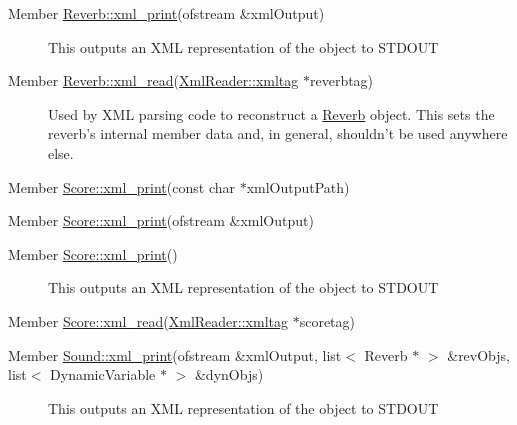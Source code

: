 \label{_deprecated000027}
\hypertarget{deprecated__deprecated000027}{}
 \begin{description}
\item[Member \hyperlink{classReverb_a12}{Reverb::xml\_\-print}(ofstream \&xml\-Output) ]This outputs an XML representation of the object to STDOUT \end{description}


\label{_deprecated000028}
\hypertarget{deprecated__deprecated000028}{}
 \begin{description}
\item[Member \hyperlink{classReverb_a19}{Reverb::xml\_\-read}(\hyperlink{classXmlReader_1_1xmltag}{Xml\-Reader::xmltag} $\ast$reverbtag) ]Used by XML parsing code to reconstruct a \hyperlink{classReverb}{Reverb} object. This sets the reverb's internal member data and, in general, shouldn't be used anywhere else. \end{description}


\label{_deprecated000031}
\hypertarget{deprecated__deprecated000031}{}
 \begin{description}
\item[Member \hyperlink{classScore_a8}{Score::xml\_\-print}(const char $\ast$xml\-Output\-Path) ]\end{description}


\label{_deprecated000030}
\hypertarget{deprecated__deprecated000030}{}
 \begin{description}
\item[Member \hyperlink{classScore_a7}{Score::xml\_\-print}(ofstream \&xml\-Output) ]\end{description}


\label{_deprecated000029}
\hypertarget{deprecated__deprecated000029}{}
 \begin{description}
\item[Member \hyperlink{classScore_a6}{Score::xml\_\-print}() ]This outputs an XML representation of the object to STDOUT \end{description}


\label{_deprecated000032}
\hypertarget{deprecated__deprecated000032}{}
 \begin{description}
\item[Member \hyperlink{classScore_a9}{Score::xml\_\-read}(\hyperlink{classXmlReader_1_1xmltag}{Xml\-Reader::xmltag} $\ast$scoretag) ]\end{description}


\label{_deprecated000033}
\hypertarget{deprecated__deprecated000033}{}
 \begin{description}
\item[Member \hyperlink{classSound_a9}{Sound::xml\_\-print}(ofstream \&xml\-Output, list$<$ Reverb $\ast$ $>$ \&rev\-Objs, list$<$ Dynamic\-Variable $\ast$ $>$ \&dyn\-Objs) ]This outputs an XML representation of the object to STDOUT \end{description}


